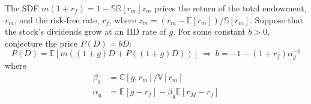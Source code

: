 \documentclass{article}
\begin{document}
The SDF $m(1+r_{f})=1-\mathbb{S}\mathbb{R}[r_{m}]z_{m}$ prices the return of the total endowment, $r_{m}$, and the risk-free rate, $r_{f}$, where $z_{m}=(r_{m}-\mathbb{E}[r_{m}])/\mathbb{S}[r_{m}]$. Suppose that the stock's dividends grow at an IID rate of $g$. For some constant $b>0$, conjecture the price $P(D)=bD$: 
\begin{equation}
	P(D)=\mathbb{E}[m((1+g)D+P((1+g)D))]\:\Rightarrow\:b=-1-(1+r_{f})\alpha_{g}^{-1}
\end{equation}
where 
\begin{align}
	\beta_{g}&=\mathbb{C}[g,r_{m}]/\mathbb{V}[r_{m}]\\
	\alpha_{g}&=\mathbb{E}[g-r_{f}]-\beta_{g}\mathbb{E}[r_{M}-r_{f}]
\end{align}
\end{document}
